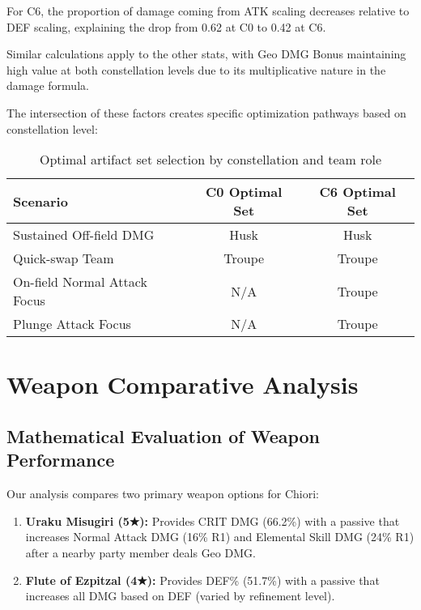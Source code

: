 \documentclass[12pt,a4paper]{article}
\begin{document}
For C6, the proportion of damage coming from ATK scaling decreases relative to DEF scaling, explaining the drop from 0.62 at C0 to 0.42 at C6.

Similar calculations apply to the other stats, with Geo DMG Bonus maintaining high value at both constellation levels due to its multiplicative nature in the damage formula.

The intersection of these factors creates specific optimization pathways based on constellation level:

\begin{table}[h]
\centering
\begin{tabular}{lcc}
\toprule
\textbf{Scenario} & \textbf{C0 Optimal Set} & \textbf{C6 Optimal Set} \\
\midrule
Sustained Off-field DMG & Husk & Husk \\
Quick-swap Team & Troupe & Troupe \\
On-field Normal Attack Focus & N/A & Troupe \\
Plunge Attack Focus & N/A & Troupe \\
\bottomrule
\end{tabular}
\caption{Optimal artifact set selection by constellation and team role}
\label{tab:artifact_selection}
\end{table}

\section{Weapon Comparative Analysis}

\subsection{Mathematical Evaluation of Weapon Performance}

Our analysis compares two primary weapon options for Chiori:

\begin{enumerate}
    \item \textbf{Uraku Misugiri (5★):} Provides CRIT DMG (66.2\%) with a passive that increases Normal Attack DMG (16\% R1) and Elemental Skill DMG (24\% R1) after a nearby party member deals Geo DMG.
    \item \textbf{Flute of Ezpitzal (4★):} Provides DEF\% (51.7\%) with a passive that increases all DMG based on DEF (varied by refinement level).
\end{enumerate}
\end{document}
